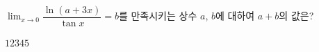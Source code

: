 $\displaystyle\lim_{x\to 0}\dfrac{\ln(a+3x)}{\tan x}=b$를 만족시키는 상수 $a$, $b$에 대하여 $a+b$의 값은?
\begin{choices32}{$1$}{$2$}{$3$}{$4$}{$5$}\end{choices32}
